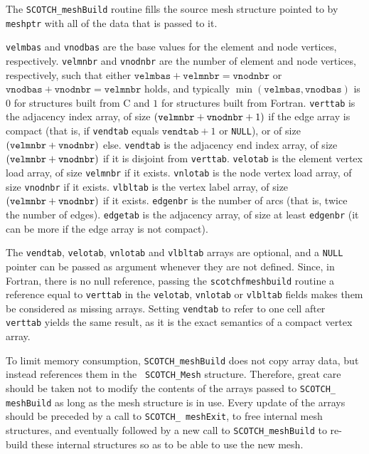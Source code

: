 \begin{itemize}
\progdes

The {\tt SCOTCH\_meshBuild} routine fills the source mesh structure
pointed to by {\tt meshptr} with all of the data that is passed to it.

{\tt velmbas} and {\tt vnodbas} are the base values for the element
and node vertices, respectively.
{\tt velmnbr} and {\tt vnodnbr} are the number of element and node
vertices, respectively, such that either $\mathtt{velmbas}
+\mathtt{velmnbr}=\mathtt{vnodnbr}$ or $\mathtt{vnodbas}
+\mathtt{vnodnbr}=\mathtt{velmnbr}$ holds, and typically
$\min(\mathtt{velmbas}, \mathtt{vnodbas})$ is $0$ for
structures built from C and $1$ for structures built from Fortran.
{\tt verttab} is the adjacency index array, of size $({\tt velmnbr} +
{\tt vnodnbr} + 1)$ if the edge array is compact (that is, if
{\tt vendtab} equals $\mathtt{vendtab}+1$ or {\tt NULL}), or of
size $({\tt velmnbr} + {\tt vnodnbr})$ else.
{\tt vendtab} is the adjacency end index array, of size $({\tt velmnbr} +
{\tt vnodnbr})$ if it is disjoint from {\tt verttab}.
{\tt velotab} is the element vertex load array, of size {\tt velmnbr}
if it exists.
{\tt vnlotab} is the node vertex load array, of size {\tt vnodnbr} if
it exists.
{\tt vlbltab} is the vertex label array, of size $({\tt velmnbr} +
{\tt vnodnbr})$ if it exists.
{\tt edgenbr} is the number of arcs (that is, twice the number of edges).
{\tt edgetab} is the adjacency array, of size at least {\tt edgenbr}
(it can be more if the edge array is not compact).

The {\tt vendtab}, {\tt velotab}, {\tt vnlotab} and {\tt vlbltab}
arrays are optional, and a {\tt NULL} pointer can be passed as
argument whenever they are not defined.
Since, in Fortran, there is no null reference, passing the
{\tt scotchf\lbt mesh\lbt build} routine a reference equal to
{\tt verttab} in the {\tt velotab}, {\tt vnlotab} or {\tt vlbltab}
fields makes them be considered as missing arrays. Setting
{\tt vendtab} to refer to one cell after {\tt verttab} yields the
same result, as it is the exact semantics of a compact vertex array.

To limit memory consumption, {\tt SCOTCH\_\lbt mesh\lbo Build} does
not copy array data, but instead references them in the {\tt
SCOTCH\_\lbt Mesh} structure. Therefore, great care should be taken
not to modify the contents of the arrays passed to {\tt SCOTCH\_\lbt
mesh\lbo Build} as long as the mesh structure is in use. Every
update of the arrays should be preceded by a call to {\tt SCOTCH\_\lbt
mesh\lbo Exit}, to free internal mesh structures, and eventually
followed by a new call to {\tt SCOTCH\_\lbt mesh\lbo Build} to
re-build these internal structures so as to be able to use the new
mesh.


\end{itemize}
